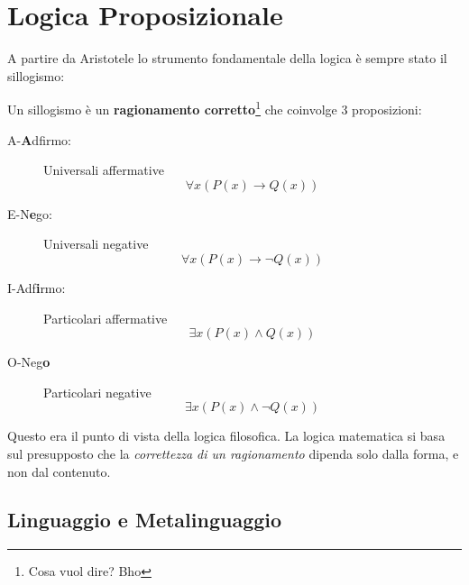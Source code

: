 \documentclass[11pt]{scrartcl}
\begin{document}
	\section{Logica Proposizionale}
	A partire da Aristotele lo strumento fondamentale della logica è sempre stato il sillogismo:
	\begin{definition}[Sillogismo]
		Un sillogismo è un \textbf{ragionamento corretto}\footnote{Cosa vuol dire? Bho} che coinvolge $3$ proposizioni:
		\begin{description}
			\item[A-\textbf{A}dfirmo:] Universali affermative
			$$\forall x ( P(x) \to Q(x))$$
			\item[E-N\textbf{e}go:] Universali negative
			$$\forall x ( P(x) \to \lnot Q(x))$$
			\item[I-Adf\textbf{i}rmo:] Particolari affermative
			$$\exists x ( P(x)\land Q(x))$$
			\item[O-Neg\textbf{o}] Particolari negative
			$$\exists x ( P(x)\land \lnot Q(x))$$
		\end{description}
	\end{definition}
	Questo era il punto di vista della logica filosofica. La logica matematica si basa sul presupposto che la \textit{correttezza di un ragionamento} dipenda solo dalla forma, e non dal contenuto.
	
	\subsection{Linguaggio e Metalinguaggio}
	
\end{document}
